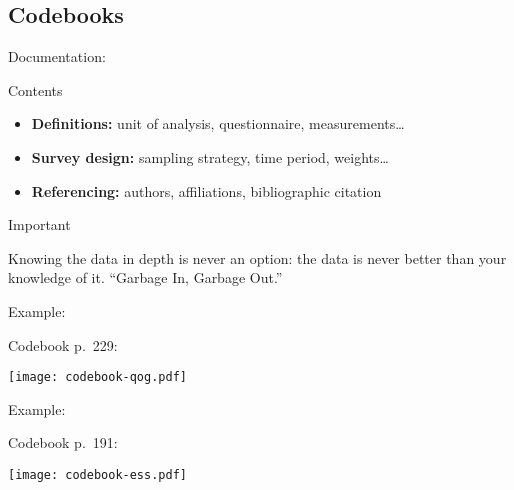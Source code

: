 \documentclass[t]{beamer}
\begin{document}
  \subsection{Codebooks}
	
	\begin{frame}[t]{Documentation: }
			
  \begin{block}{Contents}

		\begin{itemize}

			\item \textbf{Definitions:} unit of analysis, questionnaire, measurements…
				
			\item \textbf{Survey design:} sampling strategy, time period, weights…

			\item \textbf{Referencing:} authors, affiliations, bibliographic citation
		\end{itemize}
	  
  \end{block}

	\begin{alertblock}{Important}
		
		Knowing the data in depth is never an option: the data is never %
		better than your knowledge of it. ``Garbage In, Garbage Out.'' 
	
	\end{alertblock}	
	
	\end{frame}
	
	\begin{frame}[t]{Example: }

		Codebook p.~229:

		\begin{center}
			\texttt{[image: codebook-qog.pdf]}		
		\end{center}
		
	\end{frame}
	
	\begin{frame}[t]{Example: }
		
    Codebook p.~191:

		\begin{center}
			\texttt{[image: codebook-ess.pdf]}		
		\end{center}

	\end{frame}
	
\end{document}
